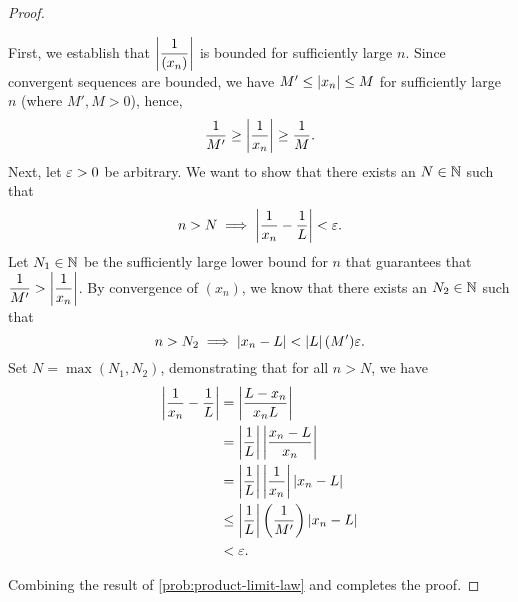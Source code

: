 \begin{problem}
\begin{enumerate}[label=(\alph*)]
\begin{proof}
          \begin{subproof}
            First, we establish that $\left\lvert \dfrac{1}{(x_{n})} \right\rvert$ is bounded for
            sufficiently large $n$. Since convergent\footnotemark{} sequences are
            bounded, we have $M' \leq \left\lvert x_{n} \right\rvert \leq M$ for sufficiently large $n$
            (where $M', M > 0$), hence, 
            \[
              \dfrac{1}{M'} \geq \left\lvert \dfrac{1}{x_{n}} \right\rvert \geq \dfrac{1}{M}.
            \]
            Next, let $\varepsilon > 0$ be arbitrary. We want to show that there exists
            an $N \in \mathbb{N}$ such that
            \begin{align*}
              n > N \implies \left\lvert \frac{1}{x_{n}} - \frac{1}{L} \right\rvert < \varepsilon.
            \end{align*}
            Let $N_{1} \in \mathbb{N}$ be the sufficiently large lower bound for $n$ that guarantees that
            $\dfrac{1}{M'} > \left\lvert \dfrac{1}{x_{n}} \right\rvert$. By convergence of
            $(x_{n})$, we know that there exists an $N_{2} \in \mathbb{N}$ such that
            \[
              n > N_{2} \implies \left\lvert x_{n} - L \right\rvert < \left\lvert L \right\rvert (M') \varepsilon.
            \]
            Set $N = \max(N_{1}, N_{2})$, demonstrating that for all $n > N$, we have
            \begin{align*}
              \left\lvert \dfrac{1}{x_{n}} - \dfrac{1}{L} \right\rvert &= \left\lvert \dfrac{L - x_{n}}{x_{n}L} \right\rvert \\
                                                    &= \left\lvert \dfrac{1}{L} \right\rvert \left\lvert \dfrac{x_{n} - L}{x_{n}} \right\rvert \\
                                                    &= \left\lvert \dfrac{1}{L} \right\rvert \left\lvert \dfrac{1}{x_{n}} \right\rvert \left\lvert x_{n} - L \right\rvert \\
                                                    &\leq \left\lvert \dfrac{1}{L} \right\rvert \left( \dfrac{1}{M'} \right) \left\lvert x_{n} - L \right\rvert \\
                                                    &< \varepsilon.
            \end{align*}
          \end{subproof}

          Combining the result of \ref{prob:product-limit-law} and
           completes the proof.
        \end{proof}

    \end{enumerate}
\end{problem}


